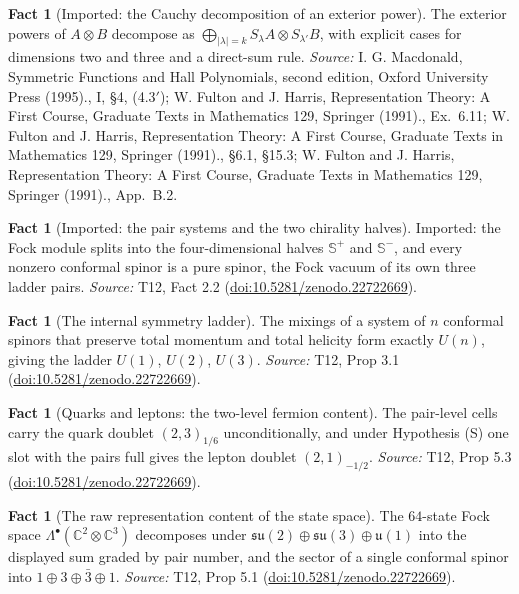 \documentclass[11pt]{article}
\theoremstyle{definition}
\newtheorem{fact}[theorem]{Fact}
\theoremstyle{plain}
\providecommand{\C}{}\renewcommand{\C}{\mathbb{C}}
\providecommand{\CS}{}\renewcommand{\CS}{{\mathbb{S}^{+}}}
\providecommand{\CSm}{}\renewcommand{\CSm}{{\mathbb{S}^{-}}}
\providecommand{\su}{}\renewcommand{\su}{\mathfrak{su}}
\providecommand{\uu}{}\renewcommand{\uu}{\mathfrak{u}}
\begin{document}
\begin{fact}[Imported: the Cauchy decomposition of an exterior power]\label{c:standard-model.imported-cauchy-decomposition-exterior-power}
The exterior powers of $A \otimes B$ decompose as $\bigoplus_{|\lambda| = k} S_{\lambda}A \otimes S_{\lambda'}B$, with explicit cases for dimensions two and three and a direct-sum rule.
\emph{Source:} I. G. Macdonald, Symmetric Functions and Hall Polynomials, second edition, Oxford University Press (1995)., I, \S 4, (4.3$'$); W. Fulton and J. Harris, Representation Theory: A First Course, Graduate Texts in Mathematics 129, Springer (1991)., Ex.~6.11; W. Fulton and J. Harris, Representation Theory: A First Course, Graduate Texts in Mathematics 129, Springer (1991)., \S 6.1, \S 15.3; W. Fulton and J. Harris, Representation Theory: A First Course, Graduate Texts in Mathematics 129, Springer (1991)., App.~B.2.
\end{fact}

\begin{fact}[Imported: the pair systems and the two chirality halves]\label{c:standard-model.imported-pair-systems-two-chirality-halves}
Imported: the Fock module splits into the four-dimensional halves $\CS$ and $\CSm$, and every nonzero conformal spinor is a pure spinor, the Fock vacuum of its own three ladder pairs.
\emph{Source:} T12, Fact 2.2 (\href{https://doi.org/10.5281/zenodo.22722669}{doi:10.5281/zenodo.22722669}).
\end{fact}

\begin{fact}[The internal symmetry ladder]\label{c:standard-model.internal-symmetry-ladder}
The mixings of a system of $n$ conformal spinors that preserve total momentum and total helicity form exactly $U(n)$, giving the ladder $U(1)$, $U(2)$, $U(3)$.
\emph{Source:} T12, Prop 3.1 (\href{https://doi.org/10.5281/zenodo.22722669}{doi:10.5281/zenodo.22722669}).
\end{fact}

\begin{fact}[Quarks and leptons: the two-level fermion content]\label{c:standard-model.quarks-leptons-two-level-fermion-content}
The pair-level cells carry the quark doublet $(2,3)_{1/6}$ unconditionally, and under Hypothesis (S) one slot with the pairs full gives the lepton doublet $(2,1)_{-1/2}$.
\emph{Source:} T12, Prop 5.3 (\href{https://doi.org/10.5281/zenodo.22722669}{doi:10.5281/zenodo.22722669}).
\end{fact}

\begin{fact}[The raw representation content of the state space]\label{c:standard-model.raw-representation-content-state-space}
The $64$-state Fock space $\Lambda^{\bullet}(\C^{2} \otimes \C^{3})$ decomposes under $\su(2) \oplus \su(3) \oplus \uu(1)$ into the displayed sum graded by pair number, and the sector of a single conformal spinor into $1 \oplus 3 \oplus \bar{3} \oplus 1$.
\emph{Source:} T12, Prop 5.1 (\href{https://doi.org/10.5281/zenodo.22722669}{doi:10.5281/zenodo.22722669}).
\end{fact}
\end{document}
